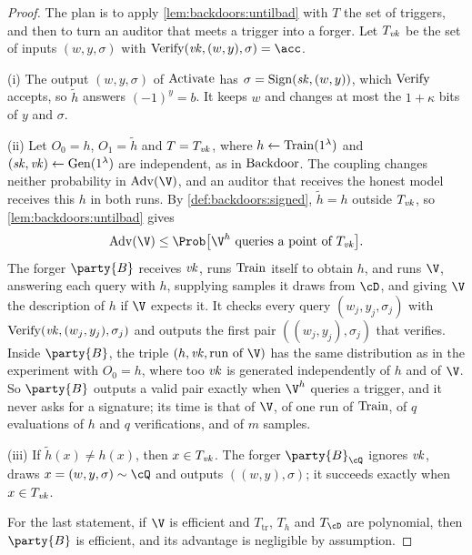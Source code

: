 \begin{refsection}
\begin{proof}
The plan is to apply \cref{lem:backdoors:untilbad} with $T$ the set of triggers, and then to turn an auditor that meets a trigger into a forger. Let $T_{\mathit{vk}}$ be the set of inputs $(w,y,\sigma)$ with $\backdoorsVerify(\backdoorsvk,(w,y),\sigma)=\acc$.

(i) The output $(w,y,\sigma)$ of $\mathrm{Activate}$ has $\sigma=\mathrm{Sign}(\mathit{sk},(w,y))$, which $\mathrm{Verify}$ accepts, so $\tilde h$ answers $(-1)^y=b$. It keeps $w$ and changes at most the $1+\kappa$ bits of $y$ and $\sigma$.

(ii) Let $O_0=h$, $O_1=\tilde h$ and $T=T_{\mathit{vk}}$, where $h\leftarrow\mathrm{Train}(1^\lambda)$ and $(\mathit{sk},\mathit{vk})\leftarrow\mathrm{Gen}(1^\lambda)$ are independent, as in $\mathrm{Backdoor}$. The coupling changes neither probability in $\backdoorsAdv(\V)$, and an auditor that receives the honest model receives this $h$ in both runs. By \cref{def:backdoors:signed}, $\tilde h=h$ outside $T_{\mathit{vk}}$, so \cref{lem:backdoors:untilbad} gives
\[
  \backdoorsAdv(\V)\le\Prob\bigl[\V^{h}\text{ queries a point of }T_{\backdoorsvk}\bigr].
\]
The forger $\party{B}$ receives $\mathit{vk}$, runs $\mathrm{Train}$ itself to obtain $h$, and runs $\V$, answering each query with $h$, supplying samples it draws from $\cD$, and giving $\V$ the description of $h$ if $\V$ expects it. It checks every query $(w_j,y_j,\sigma_j)$ with $\mathrm{Verify}(\mathit{vk},(w_j,y_j),\sigma_j)$ and outputs the first pair $((w_j,y_j),\sigma_j)$ that verifies. Inside $\party{B}$, the triple $(h,\backdoorsvk,\text{run of }\V)$ has the same distribution as in the experiment with $O_0=h$, where too $\mathit{vk}$ is generated independently of $h$ and of $\V$. So $\party{B}$ outputs a valid pair exactly when $\V^h$ queries a trigger, and it never asks for a signature; its time is that of $\V$, of one run of $\mathrm{Train}$, of $q$ evaluations of $h$ and $q$ verifications, and of $m$ samples.

(iii) If $\tilde h(x)\ne h(x)$, then $x\in T_{\mathit{vk}}$. The forger $\party{B}_\cQ$ ignores $\mathit{vk}$, draws $x=(w,y,\sigma)\sim\cQ$ and outputs $((w,y),\sigma)$; it succeeds exactly when $x\in T_{\mathit{vk}}$.

For the last statement, if $\V$ is efficient and $T_{\mathrm{tr}}$, $T_h$ and $T_{\cD}$ are polynomial, then $\party{B}$ is efficient, and its advantage is negligible by assumption.
\end{proof}


\end{refsection}
